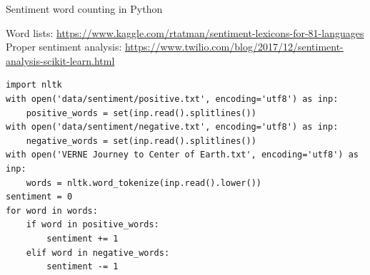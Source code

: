 \documentclass[aspectratio=169,usenames,dvipsnames]{beamer}
\begin{document}
\begin{frame}[fragile]{Sentiment word counting in Python}
    \begin{reference}\scriptsize
        Word lists: \url{https://www.kaggle.com/rtatman/sentiment-lexicons-for-81-languages} \\
        Proper sentiment analysis: \url{https://www.twilio.com/blog/2017/12/sentiment-analysis-scikit-learn.html}
    \end{reference}
\begin{lstlisting}[style=smaller]
import nltk
with open('data/sentiment/positive.txt', encoding='utf8') as inp:
    positive_words = set(inp.read().splitlines())
with open('data/sentiment/negative.txt', encoding='utf8') as inp:
    negative_words = set(inp.read().splitlines())
with open('VERNE Journey to Center of Earth.txt', encoding='utf8') as inp:
    words = nltk.word_tokenize(inp.read().lower())
sentiment = 0
for word in words:
    if word in positive_words:
        sentiment += 1
    elif word in negative_words:
        sentiment -= 1
\end{lstlisting}
\end{frame}
\end{document}
